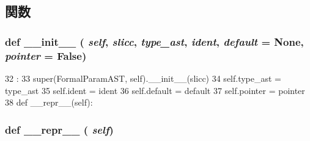 \subsection{関数}
\hypertarget{classslicc_1_1ast_1_1FormalParamAST_1_1FormalParamAST_ac775ee34451fdfa742b318538164070e}{
\subsubsection[{\_\-\_\-init\_\-\_\-}]{\setlength{\rightskip}{0pt plus 5cm}def \_\-\_\-init\_\-\_\- ( {\em self}, \/   {\em slicc}, \/   {\em type\_\-ast}, \/   {\em ident}, \/   {\em default} = {\ttfamily None}, \/   {\em pointer} = {\ttfamily False})}}
\label{classslicc_1_1ast_1_1FormalParamAST_1_1FormalParamAST_ac775ee34451fdfa742b318538164070e}



\begin{DoxyCode}
32                                                                                :
33         super(FormalParamAST, self).__init__(slicc)
34         self.type_ast = type_ast
35         self.ident = ident
36         self.default = default
37         self.pointer = pointer
38 
    def __repr__(self):
\end{DoxyCode}
\hypertarget{classslicc_1_1ast_1_1FormalParamAST_1_1FormalParamAST_ad8b9328939df072e4740cd9a63189744}{
\subsubsection[{\_\-\_\-repr\_\-\_\-}]{\setlength{\rightskip}{0pt plus 5cm}def \_\-\_\-repr\_\-\_\- ( {\em self})}}
\label{classslicc_1_1ast_1_1FormalParamAST_1_1FormalParamAST_ad8b9328939df072e4740cd9a63189744}



